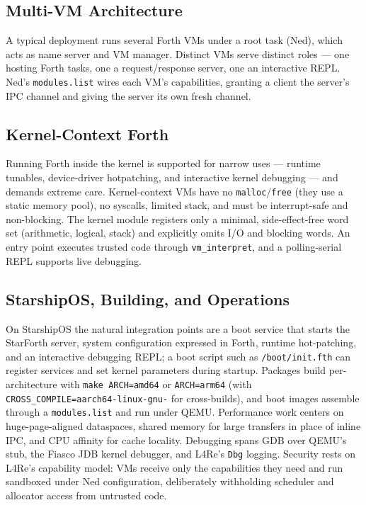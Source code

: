 \subsection{Multi-VM Architecture}

A typical deployment runs several Forth VMs under a root task (Ned), which acts
as name server and VM manager. Distinct VMs serve distinct roles --- one
hosting Forth tasks, one a request/response server, one an interactive REPL.
Ned's \texttt{modules.list} wires each VM's capabilities, granting a client the
server's IPC channel and giving the server its own fresh channel.

\subsection{Kernel-Context Forth}

Running Forth inside the kernel is supported for narrow uses --- runtime
tunables, device-driver hotpatching, and interactive kernel debugging --- and
demands extreme care. Kernel-context VMs have no \texttt{malloc}/\texttt{free}
(they use a static memory pool), no syscalls, limited stack, and must be
interrupt-safe and non-blocking. The kernel module registers only a minimal,
side-effect-free word set (arithmetic, logical, stack) and explicitly omits I/O
and blocking words. An entry point executes trusted code through
\texttt{vm\_interpret}, and a polling-serial REPL supports live debugging.

\subsection{StarshipOS, Building, and Operations}

On StarshipOS the natural integration points are a boot service that starts the
StarForth server, system configuration expressed in Forth, runtime
hot-patching, and an interactive debugging REPL; a boot script such as
\texttt{/boot/init.fth} can register services and set kernel parameters during
startup. Packages build per-architecture with \texttt{make ARCH=amd64} or
\texttt{ARCH=arm64} (with \texttt{CROSS\_COMPILE=aarch64-linux-gnu-} for
cross-builds), and boot images assemble through a \texttt{modules.list} and run
under QEMU. Performance work centers on huge-page-aligned dataspaces, shared
memory for large transfers in place of inline IPC, and CPU affinity for cache
locality. Debugging spans GDB over QEMU's stub, the Fiasco JDB kernel
debugger, and L4Re's \texttt{Dbg} logging. Security rests on L4Re's
capability model: VMs receive only the capabilities they need and run sandboxed
under Ned configuration, deliberately withholding scheduler and allocator
access from untrusted code.

